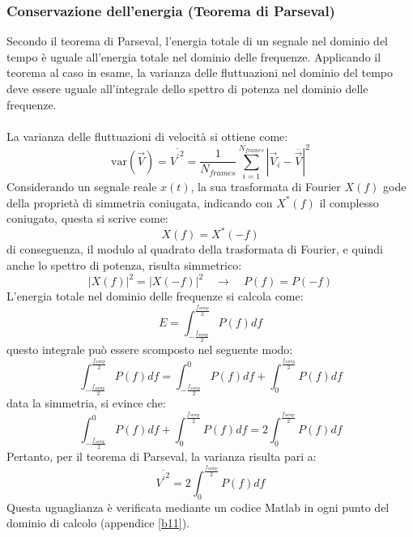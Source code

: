 \subsubsection{Conservazione dell'energia (Teorema di Parseval)}
Secondo il teorema di Parseval, l'energia totale di un segnale nel dominio del tempo è uguale all'energia totale nel dominio delle frequenze. Applicando il teorema al caso in esame, la varianza delle fluttuazioni nel dominio del tempo deve essere uguale all'integrale dello spettro di potenza nel dominio delle frequenze.\\\\
La varianza delle fluttuazioni di velocità si ottiene come:
\begin{equation*}
    \text{var}(\vec V) = \overline{{V^\prime}^2} = \frac 1{N_{frames}} \sum_{i=1}^{N_{frames}} \left|{\vec V_i} - {\overline {\vec V}}\right|^2
\end{equation*}
Considerando un segnale reale $x(t)$, la sua trasformata di Fourier $X(f)$ gode della proprietà di simmetria coniugata, indicando con $X^*(f)$ il complesso coniugato, questa si scrive come:
\begin{equation*}
    X(f) = X^*(-f)
\end{equation*}
di conseguenza, il modulo al quadrato della trasformata di Fourier, e quindi anche lo spettro di potenza, risulta simmetrico:
\begin{equation*}
    |X(f)|^2 = |X(-f)|^2 \quad \rightarrow \quad P(f) = P(-f)
\end{equation*}
L'energia totale nel dominio delle frequenze si calcola come:
\begin{equation*}
    E = \int_{-\frac{f_{samp}}2}^{\frac{f_{samp}}2} P(f) df 
\end{equation*}
questo integrale può essere scomposto nel seguente modo:
\begin{equation*}
    \int_{-\frac{f_{samp}}2}^{\frac{f_{samp}}2} P(f) df = \int_{-\frac{f_{samp}}2}^{0} P(f) df + \int_{0}^{\frac{f_{samp}}2} P(f) df
\end{equation*}
data la simmetria, si evince che:
\begin{equation*}
    \int_{-\frac{f_{samp}}2}^{0} P(f) df + \int_{0}^{\frac{f_{samp}}2} P(f) df = 2\int_0^{\frac{f_{samp}}2} P(f) df
\end{equation*}
Pertanto, per il teorema di Parseval, la varianza risulta pari a:
\begin{equation*}
    \overline{{V^\prime}^2} = 2\int_0^{\frac{f_{samp}}2} P(f) df
\end{equation*}
Questa uguaglianza è verificata mediante un codice Matlab in ogni punto del dominio di calcolo (appendice \ref{b11}).

